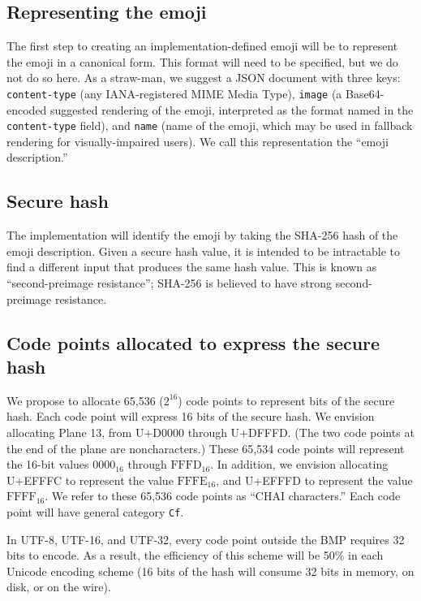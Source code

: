 \documentclass[12pt]{article}
\begin{document}
\subsection{Representing the emoji}

The first step to creating an implementation-defined emoji will be to
represent the emoji in a canonical form. This format will need to be
specified, but we do not do so here. As a straw-man, we suggest a JSON
document with three keys: \texttt{content-type} (any IANA-registered MIME
Media Type), \texttt{image} (a Base64-encoded suggested rendering of the emoji,
interpreted as the format named in the \texttt{content-type} field), and
\texttt{name} (name of the emoji, which may be used in fallback
rendering for visually-impaired users). We call this representation
the ``emoji description.''

\subsection{Secure hash}

The implementation will identify the emoji by taking the SHA-256 hash
of the emoji description. Given a secure hash value, it is intended to be
intractable to find a different input that produces the same
hash value. This is known as ``second-preimage resistance'';
SHA-256 is believed to have strong second-preimage resistance.

\subsection{Code points allocated to express the secure hash}

We propose to allocate 65,536 ($2^{16}$) code points to represent bits
of the secure hash. Each code point will express 16 bits of the secure
hash. We envision allocating Plane 13, from U+D0000 through
U+DFFFD. (The two code points at the end of the plane are
noncharacters.) These 65,534 code points will represent the 16-bit
values $\mathrm{0000}_{16}$ through $\mathrm{FFFD}_{16}$. In addition,
we envision allocating U+EFFFC to represent the value
$\mathrm{FFFE}_{16}$, and U+EFFFD to represent the value
$\mathrm{FFFF}_{16}$. We refer to these 65,536 code points as ``CHAI
characters.'' Each code point will have general category \texttt{Cf}.

In UTF-8, UTF-16, and UTF-32, every code point outside the BMP
requires 32 bits to encode. As a result, the efficiency of
this scheme will be 50\% in each Unicode encoding scheme (16 bits of
the hash will consume 32 bits in memory, on disk, or on the wire).
\end{document}
